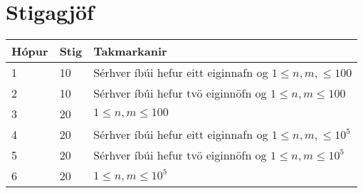 \section*{Stigagjöf}
\begin{tabular}{|l|l|l|}
\hline
Hópur & Stig & Takmarkanir \\ \hline
1     & 10   & Sérhver íbúi hefur eitt eiginnafn og $1 \leq n, m, \leq 100$ \\ \hline
2     & 10   & Sérhver íbúi hefur tvö eiginnöfn og $1 \leq n, m \leq 100$ \\ \hline
3     & 20   & $1 \leq n, m \leq 100$ \\ \hline
4     & 20   & Sérhver íbúi hefur eitt eiginnafn og $1 \leq n, m, \leq 10^5$ \\ \hline
5     & 20   & Sérhver íbúi hefur tvö eiginnöfn og $1 \leq n, m \leq 10^5$ \\ \hline
6     & 20   & $1 \leq n, m \leq 10^5$ \\ \hline
\end{tabular}

